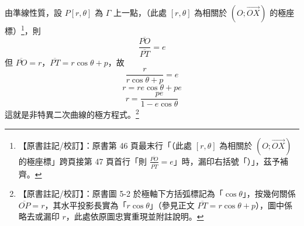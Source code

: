 由準線性質，設 $P[r, \theta]$ 為 $\Gamma$ 上一點，（此處 $[r, \theta]$ 為相關於 $(O; \vec{OX})$ 的極座標）\label{note:b5-ch1-p46-paren}\footnote{【原書註記/校訂】：原書第 46 頁最末行「（此處 $[r, \theta]$ 為相關於 $(O; \vec{OX})$ 的極座標」跨頁接第 47 頁首行「則 $\frac{\overline{PO}}{\overline{PT}} = e$」時，漏印右括號「）」，茲予補齊。}，則
\[
  \frac{\overline{PO}}{\overline{PT}} = e
\]
但 $\overline{PO} = r$，$\overline{PT} = r\cos\theta + p$，故
\[
  \frac{r}{r\cos\theta + p} = e
\]
\[
  r = re\cos\theta + pe
\]
\begin{equation}
  r = \frac{pe}{1 - e\cos\theta} \tag{1} \label{eq:b5-1-5-1}
\end{equation}
這就是非特異二次曲線的極方程式。\label{note:b5-ch1-p47-fig52}\footnote{【原書註記/校訂】：原書圖 5-2 於極軸下方括弧標記為「$\cos\theta$」，按幾何關係 $\overline{OP}=r$，其水平投影長實為「$r\cos\theta$」（參見正文 $\overline{PT}=r\cos\theta+p$），圖中係略去或漏印 $r$，此處依原圖忠實重現並附註說明。}

